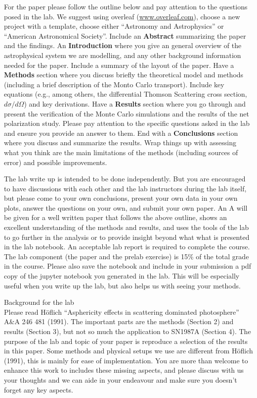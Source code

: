 \documentclass[12pt]{amsart}
\begin{document}
For the paper please follow the outline below and pay attention to the
questions posed in the lab.  We suggest using overleaf
(\url{www.overleaf.com}), choose a new project with a template, choose
either ``Astronomy and Astrophysics'' or ``American Astronomical
Society''. Include an {\bf{Abstract}} summarizing the paper and the
findings.  An {\bf{Introduction}} where you give an general overview
of the astrophysical system we are modelling, and any other background
information needed for the paper. Include a summary of the layout of
the paper. Have a {\bf{Methods}} section where you discuss briefly the
theoretical model and methods (including a brief description of the
Monto Carlo transport).  Include key equations (e.g., among others,
the differential Thomson Scattering cross section, $d\sigma/d\Omega$)
and key derivations. Have a {\bf{Results}} section where you go through and
present the verification of the Monte Carlo simulations and the
results of the net polarization study. Please pay attention to the
specific questions asked in the lab and ensure you provide an answer
to them. End with a {\bf{Conclusions}} section where you discuss and
summarize the results. Wrap things up with assessing what you think
are the main limitations of the methods (including sources of error)
and possible improvements.
\newline

The lab write up is intended to be done independently. But you are
encouraged to have discussions with each other and the lab instructors
during the lab itself, but please come to your own conclusions,
present your own data in your own plots, answer the questions on your
own, and submit your own paper. An A will be given for a well written
paper that follows the above outline, shows an excellent understanding
of the methods and results, and uses the tools of the lab to go
further in the analysis or to provide insight beyond what what is
presented in the lab notebook. An acceptable lab report is required to
complete the course.  The lab component (the paper and the prelab
exercise) is 15\% of the total grade in the course. Please also save
the notebook and include in your submission a pdf copy of the jupyter
notebook you generated in the lab.  This will be especially useful
when you write up the lab, but also helps us with seeing your methods.

\newpage

{\Large{Background for the lab}}\\

Please read H\"oflich ``Asphericity effects in scattering dominated
photosphere'' A\&A 246 481 (1991).  The important parts are the
methods (Section 2) and results (Section 3), but not so much the
application to SN1987A (Section 4).  The purpose of the lab and topic
of your paper is reproduce a selection of the results in this paper.
Some methods and physical setups we use are different from H\"oflich
(1991), this is mainly for ease of implementation.  You are more than
welcome to enhance this work to includes these missing aspects, and
please discuss with us your thoughts and we can aide in your
endeavour and make sure you doesn't forget any key aspects.
\end{document}

